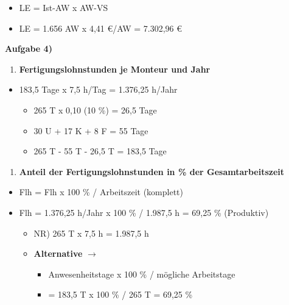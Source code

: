 \begin{itemize}
\item
  LE = Ist-AW x AW-VS
\item
  LE = 1.656 AW x 4,41 €/AW = 7.302,96 €
\end{itemize}

\textbf{Aufgabe 4)}

\begin{enumerate}
\def\labelenumi{\alph{enumi})}
\item
  \textbf{Fertigungslohnstunden je Monteur und Jahr}
\end{enumerate}

\begin{itemize}
\item
  183,5 Tage x 7,5 h/Tag = 1.376,25 h/Jahr

  \begin{itemize}
  \item
    265 T x 0,10 (10 \%) = 26,5 Tage
  \item
    30 U + 17 K + 8 F = 55 Tage
  \item
    265 T - 55 T - 26,5 T = 183,5 Tage
  \end{itemize}
\end{itemize}

\begin{enumerate}
\def\labelenumi{\alph{enumi})}
\setcounter{enumi}{1}
\item
  \textbf{Anteil der Fertigungslohnstunden in \% der Gesamtarbeitszeit}
\end{enumerate}

\begin{itemize}
\item
  Flh = Flh x 100 \% / Arbeitszeit (komplett)
\item
  Flh = 1.376,25 h/Jahr x 100 \% / 1.987,5 h = 69,25 \% (Produktiv)

  \begin{itemize}
  \item
    NR) 265 T x 7,5 h = 1.987,5 h
  \item
    \textbf{Alternative} $\to$

    \begin{itemize}
    \item
      Anwesenheitstage x 100 \% / mögliche Arbeitstage
    \item
      = 183,5 T x 100 \% / 265 T = 69,25 \%
    \end{itemize}
  \end{itemize}
\end{itemize}

